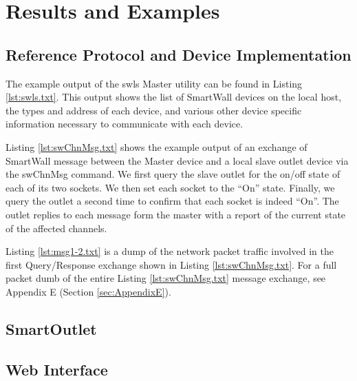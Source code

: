 \documentclass[12pt]{article}
\begin{document}
\section{Results and Examples}

\subsection{Reference Protocol and Device Implementation}

The example output of the swls Master utility can be found in Listing
\ref{lst:swls.txt}. This output shows the list of SmartWall devices on
the local host, the types and address of each device, and various
other device specific information necessary to communicate with each device.



Listing \ref{lst:swChnMsg.txt} shows the example output of an exchange
of SmartWall message between the Master device and a local slave
outlet device via the swChnMsg command. We first query the slave
outlet for the on/off state of each of its two sockets. We then set
each socket to the ``On'' state. Finally, we query the outlet a second
time to confirm that each socket is indeed ``On''. The outlet replies
to each message form the master with a report of the current state of
the affected channels.



Listing \ref{lst:msg1-2.txt} is a dump of the network packet traffic
involved in the first Query/Response exchange shown in Listing
\ref{lst:swChnMsg.txt}. For a full packet dumb of the entire
Listing \ref{lst:swChnMsg.txt} message exchange, see Appendix E (Section
\ref{sec:AppendixE}).



\subsection{SmartOutlet}

\subsection{Web Interface}
\end{document}
